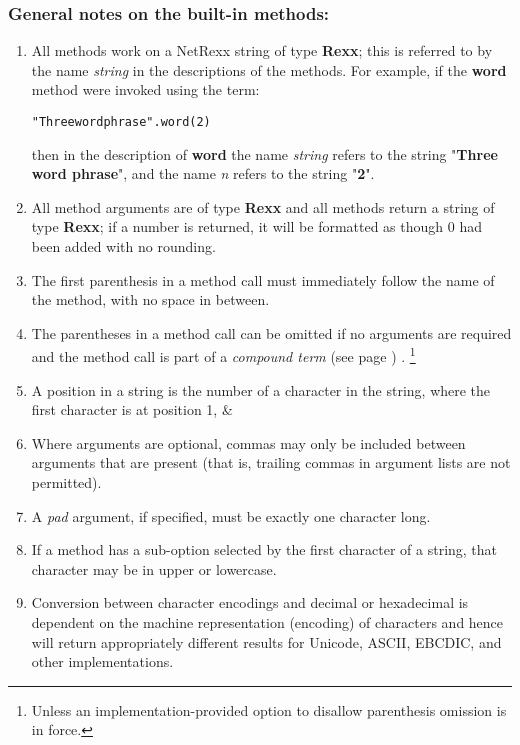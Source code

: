 \subsubsection{General notes on the built-in methods:}
\begin{enumerate}
\item All methods work on a NetRexx string of type \textbf{Rexx}; this
is referred to by the name \emph{string} in the descriptions of the
methods.  For example, if the \textbf{word} method were invoked using
the term:
\begin{alltt}
"Three word phrase".word(2)
\end{alltt}
then in the description of \textbf{word} the name
\emph{string} refers to the string "\textbf{Three word
phrase}", and the name \emph{n} refers to the string
"\textbf{2}".
\item All method arguments are of type \textbf{Rexx} and all methods
return a string of type \textbf{Rexx}; if a number is returned, it
will be formatted as though 0 had been added with no rounding.
\item 
The first parenthesis in a method call must immediately follow the name
of the method, with no space in between.
\item The parentheses in a method call can be omitted if no
arguments are required and the method call is part of a
 \emph{compound term} (see page \pageref{refcomterm}) .
\footnote{
Unless an implementation-provided option to disallow parenthesis
omission is in force.
}
\item A position in a string is the number of a character in the string,
where the first character is at position 1, \&
\item Where arguments are optional, commas may only be included between
arguments that are present (that is, trailing commas in argument lists
are not permitted).
\item A \emph{pad} argument, if specified, must be exactly one
character long.
\item If a method has a sub-option selected by the first character of a
string, that character may be in upper or lowercase.
\item Conversion between character encodings and decimal or hexadecimal
is dependent on the machine representation (encoding) of characters
and hence will return appropriately different results for Unicode,
ASCII, EBCDIC, and other implementations.
\end{enumerate}
